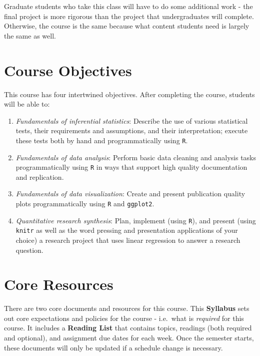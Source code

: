 \documentclass[]{book}
\theoremstyle{definition}
\theoremstyle{definition}
\theoremstyle{definition}
\theoremstyle{remark}
\begin{document}
Graduate students who take this class will have to do some additional
work - the final project is more rigorous than the project that
undergraduates will complete. Otherwise, the course is the same because
what content students need is largely the same as well.

\hypertarget{course-objectives}{%
\section{Course Objectives}\label{course-objectives}}

This course has four intertwined objectives. After completing the
course, students will be able to:

\begin{enumerate}
\def\labelenumi{\arabic{enumi}.}
\item
  \emph{Fundamentals of inferential statistics}: Describe the use of
  various statistical tests, their requirements and assumptions, and
  their interpretation; execute these tests both by hand and
  programmatically using \texttt{R}.
\item
  \emph{Fundamentals of data analysis}: Perform basic data cleaning and
  analysis tasks programmatically using \texttt{R} in ways that support
  high quality documentation and replication.
\item
  \emph{Fundamentals of data visualization}: Create and present
  publication quality plots programmatically using \texttt{R} and
  \texttt{ggplot2}.
\item
  \emph{Quantitative research synthesis}: Plan, implement (using
  \texttt{R}), and present (using \texttt{knitr} as well as the word
  pressing and presentation applications of your choice) a research
  project that uses linear regression to answer a research question.
\end{enumerate}

\hypertarget{core-resources}{%
\section{Core Resources}\label{core-resources}}

There are two core documents and resources for this course. This
\textbf{Syllabus} sets out core expectations and policies for the course
- i.e.~what is \emph{required} for this course. It includes a
\textbf{Reading List} that contains topics, readings (both required and
optional), and assignment due dates for each week. Once the semester
starts, these documents will only be updated if a schedule change is
necessary.
\end{document}
